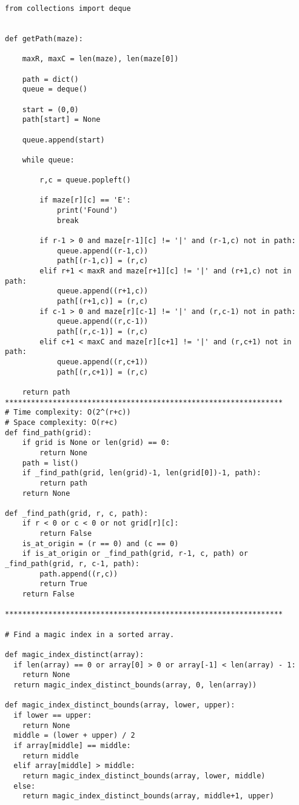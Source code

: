 \documentclass[12pt]{article}
\begin{document}
\begin{lstlisting}
from collections import deque


def getPath(maze):

	maxR, maxC = len(maze), len(maze[0])
	
	path = dict()
	queue = deque()
	
	start = (0,0)
	path[start] = None

	queue.append(start)

	while queue:

		r,c = queue.popleft()

		if maze[r][c] == 'E':
			print('Found')
			break

		if r-1 > 0 and maze[r-1][c] != '|' and (r-1,c) not in path:
			queue.append((r-1,c))
			path[(r-1,c)] = (r,c)
		elif r+1 < maxR and maze[r+1][c] != '|' and (r+1,c) not in path:	
			queue.append((r+1,c))
			path[(r+1,c)] = (r,c)
		if c-1 > 0 and maze[r][c-1] != '|' and (r,c-1) not in path:
			queue.append((r,c-1))
			path[(r,c-1)] = (r,c)
		elif c+1 < maxC and maze[r][c+1] != '|' and (r,c+1) not in path:	
			queue.append((r,c+1))
			path[(r,c+1)] = (r,c)
	
	return path
****************************************************************
# Time complexity: O(2^(r+c))
# Space complexity: O(r+c)
def find_path(grid):
    if grid is None or len(grid) == 0:
        return None
    path = list()
    if _find_path(grid, len(grid)-1, len(grid[0])-1, path):
        return path
    return None
    
def _find_path(grid, r, c, path):
    if r < 0 or c < 0 or not grid[r][c]:
        return False
    is_at_origin = (r == 0) and (c == 0)
    if is_at_origin or _find_path(grid, r-1, c, path) or _find_path(grid, r, c-1, path):
        path.append((r,c))
        return True
    return False

****************************************************************

# Find a magic index in a sorted array.

def magic_index_distinct(array):
  if len(array) == 0 or array[0] > 0 or array[-1] < len(array) - 1:
    return None
  return magic_index_distinct_bounds(array, 0, len(array))

def magic_index_distinct_bounds(array, lower, upper):
  if lower == upper:
    return None
  middle = (lower + upper) / 2
  if array[middle] == middle:
    return middle
  elif array[middle] > middle:
    return magic_index_distinct_bounds(array, lower, middle)
  else:
    return magic_index_distinct_bounds(array, middle+1, upper)


\end{lstlisting}
\end{document}
